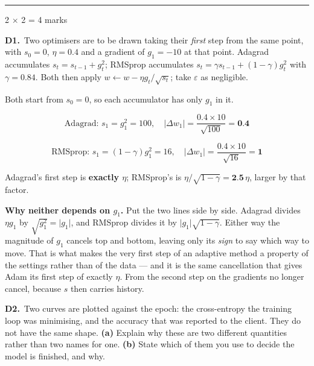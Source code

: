 \documentclass[10pt,a4paper]{article}
\newcommand{\parthead}[2]{\vspace{2pt}\noindent\rule{\linewidth}{0.4pt}\par\vspace{2pt}%
  \noindent{\bfseries Part #1}\hfill{\small #2}\par\vspace{1pt}}
\newcommand{\sol}[1]{\textbf{#1}}
\begin{document}
\newpage

\parthead{D --- Short answer}{2 $\times$ 2 = 4 marks}

\textbf{D1.}\ Two optimisers are to be drawn taking their \emph{first} step from the same point, with $s_0 = 0$, $\eta = 0.4$ and a gradient of $g_1 = -10$ at that point. Adagrad accumulates $s_t = s_{t-1} + g_t^2$; RMSprop accumulates $s_t = \gamma s_{t-1} + (1-\gamma)g_t^2$ with $\gamma = 0.84$. Both then apply $w \leftarrow w - \eta g_t/\sqrt{s_t}$; take $\varepsilon$ as negligible.

\vspace{2pt}

Both start from $s_0 = 0$, so each accumulator has only $g_1$ in it.

\[ \text{Adagrad: } s_1 = g_1^2 = 100, \quad \lvert \Delta w_1 \rvert = \frac{0.4 \times 10}{\sqrt{100}} = \sol{0.4} \]

\[ \text{RMSprop: } s_1 = (1-\gamma) g_1^2 = 16, \quad \lvert \Delta w_1 \rvert = \frac{0.4 \times 10}{\sqrt{16}} = \sol{1} \]

Adagrad's first step is \sol{exactly $\eta$}; RMSprop's is $\eta/\sqrt{1-\gamma} = \sol{2.5}\,\eta$, larger by that factor.

\vspace{2pt}

\textbf{Why neither depends on $g_1$.} Put the two lines side by side. Adagrad divides $\eta g_1$ by $\sqrt{g_1^2} = \lvert g_1 \rvert$, and RMSprop divides it by $\lvert g_1 \rvert \sqrt{1-\gamma}$. Either way the magnitude of $g_1$ cancels top and bottom, leaving only its \emph{sign} to say which way to move. That is what makes the very first step of an adaptive method a property of the settings rather than of the data --- and it is the same cancellation that gives Adam its first step of exactly $\eta$. From the second step on the gradients no longer cancel, because $s$ then carries history.

\vspace{6pt}

\textbf{D2.}\ Two curves are plotted against the epoch: the cross-entropy the training loop was minimising, and the accuracy that was reported to the client. They do not have the same shape. \textbf{(a)} Explain why these are two different quantities rather than two names for one. \textbf{(b)} State which of them you use to decide the model is finished, and why.

\vspace{2pt}
\end{document}
